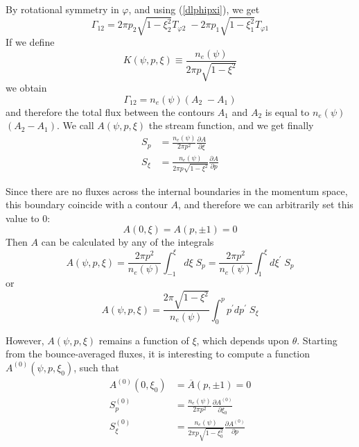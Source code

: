 By rotational symmetry in $\varphi$, and using (\ref{dlphipxi}), we get
\begin{equation}
\Gamma_{12}=2\pi p_{2}\sqrt{1-\xi_{2}^{2}}T_{\varphi2}\;-2\pi p_{1}\sqrt
{1-\xi_{1}^{2}}T_{\varphi1}
\end{equation}
If we define
\begin{equation}
K\left( \psi,p,\xi\right) \equiv\frac{n_{e}\left( \psi\right) }{2\pi p\sqrt{
1-\xi^{2}}}
\end{equation}
we obtain
\begin{equation}
\Gamma_{12}=n_{e}\left( \psi\right) \left( A_{2}\;-A_{1}\right)
\end{equation}
and therefore the total flux between the contours $A_{1}$ and $A_{2}$ is
equal to $n_{e}\left( \psi\right) $ $\left( A_{2}-A_{1}\right) $. We call $%
A\left( \psi,p,\xi\right) $ the stream function, and we get finally
\begin{align}
S_{p} & =\frac{n_{e}\left( \psi\right) }{2\pi p^{2}}\frac{\partial A}{
\partial\xi} \\
S_{\xi} & =\frac{n_{e}\left( \psi\right) }{2\pi p\sqrt{1-\xi^{2}}}\frac{
\partial A}{\partial p}
\end{align}

Since there are no fluxes across the internal boundaries in the momentum
space, this boundary coincide with a contour $A$, and therefore we can
arbitrarily set this value to $0$:
\begin{equation}
A\left( 0,\xi\right) =A\left( p,\pm1\right) =0
\end{equation}
Then $A$ can be calculated by any of the integrals
\begin{equation}
A\left( \psi,p,\xi\right) =\frac{2\pi p^{2}}{n_{e}\left( \psi\right) }
\int_{-1}^{\xi}d\xi\;S_{p}=\frac{2\pi p^{2}}{n_{e}\left( \psi\right) }
\int_{1}^{\xi}d\xi^{\prime}\;S_{p}
\end{equation}
or
\begin{equation}
A\left( \psi,p,\xi\right) =\frac{2\pi\sqrt{1-\xi^{2}}}{n_{e}\left(
\psi\right) }\int_{0}^{p}p^{\prime}dp^{\prime}\;S_{\xi}
\end{equation}

However, $A\left( \psi,p,\xi\right) $ remains a function of $\xi$, which
depends upon $\theta$. Starting from the bounce-averaged fluxes, it is
interesting to compute a function $A^{\left( 0\right) }\left( \psi
,p,\xi_{0}\right) $, such that
\begin{align}
A^{\left( 0\right) }\left( 0,\xi_{0}\right) & =\overline{A}\left(
p,\pm1\right) =0  \nonumber \\
S_{p}^{\left( 0\right) } & =\frac{n_{e}\left( \psi\right) }{2\pi p^{2}}\frac{
\partial A^{\left( 0\right) }}{\partial\xi_{0}}  \label{A0} \\
S_{\xi}^{\left( 0\right) } & =\frac{n_{e}\left( \psi\right) }{2\pi p\sqrt{
1-\xi_{0}^{2}}}\frac{\partial A^{\left( 0\right) }}{\partial p}  \nonumber
\end{align}

